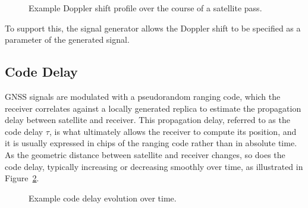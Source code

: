 \begin{figure}[htbp]
  \centering
  \caption{Example Doppler shift profile over the course of a satellite pass.}
  \label{fig:doppler}
\end{figure}

To support this, the signal generator allows the Doppler shift to be specified
as a parameter of the generated signal.

\subsection{Code Delay}

\gls{GNSS} signals are modulated with a pseudorandom ranging code, which the
receiver correlates against a locally generated replica to estimate the
propagation delay between satellite and receiver. This propagation delay,
referred to as the code delay $\tau$, is what ultimately allows the receiver
to compute its position, and it is usually expressed in chips of the ranging
code rather than in absolute time. As the geometric distance between satellite
and receiver changes, so does the code delay, typically increasing or
decreasing smoothly over time, as illustrated in
Figure~\ref{fig:code-delay}.

\begin{figure}[htbp]
  \centering
  \caption{Example code delay evolution over time.}
  \label{fig:code-delay}
\end{figure}

